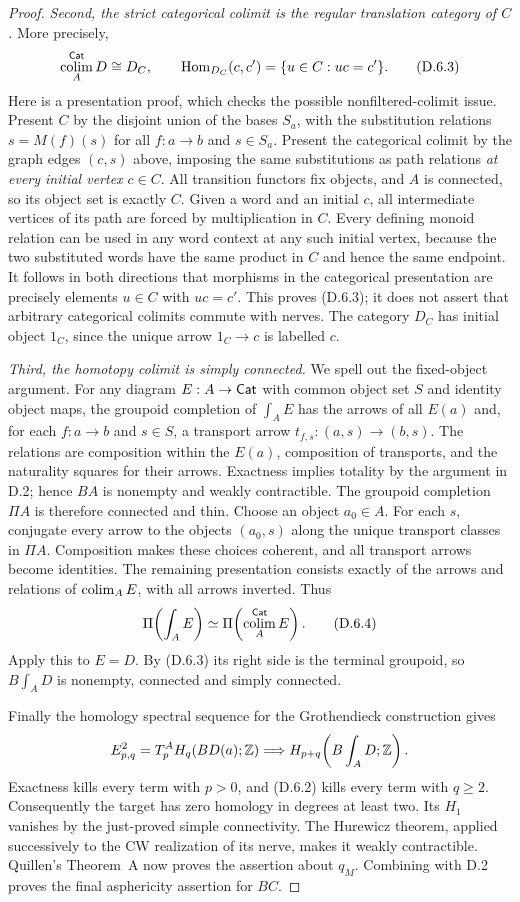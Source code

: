 \begin{proof}
\emph{Second, the strict categorical colimit is the regular
translation category of $C$.} More precisely,
\[
 \operatorname*{colim}_A^{\mathsf{Cat}}D\cong D_C,
 \qquad
 \operatorname{Hom}_{D_C}(c,c')=\{u\in C:uc=c'\}.
 \tag{D.6.3}
\]
Here is a presentation proof, which checks the possible
nonfiltered-colimit issue. Present $C$ by the disjoint union of
the bases $S_a$, with the substitution relations
$s=M(f)(s)$ for all $f:a\to b$ and $s\in S_a$.
Present the categorical colimit by the graph edges $(c,s)$
above, imposing the same substitutions as path relations
\emph{at every initial vertex $c\in C$}. All transition
functors fix objects, and $A$ is connected, so its object set
is exactly $C$. Given a word and an initial $c$, all intermediate
vertices of its path are forced by multiplication in $C$.
Every defining monoid relation can be used in any word context
at any such initial vertex, because the two substituted words
have the same product in $C$ and hence the same endpoint.
It follows in both directions that morphisms in the categorical
presentation are precisely elements $u\in C$ with $uc=c'$.
This proves (D.6.3); it does not assert that arbitrary categorical
colimits commute with nerves. The category $D_C$ has initial
object $1_C$, since the unique arrow $1_C\to c$ is labelled $c$.

\emph{Third, the homotopy colimit is simply connected.}
We spell out the fixed-object argument. For any diagram
$E:A\to\mathsf{Cat}$ with common object set $S$ and identity object
maps, the groupoid completion of $\int_A E$ has the arrows of
all $E(a)$ and, for each $f:a\to b$ and $s\in S$, a transport
arrow $t_{f,s}:(a,s)\to(b,s)$. The relations are composition
within the $E(a)$, composition of transports, and the
naturality squares for their arrows. Exactness implies totality
by the argument in D.2; hence $BA$ is nonempty and weakly
contractible. The groupoid completion $\Pi A$ is therefore
connected and thin. Choose an object $a_0\in A$. For each $s$,
conjugate every arrow to the objects $(a_0,s)$ along the unique
transport classes in $\Pi A$. Composition makes these choices
coherent, and all transport arrows become identities. The
remaining presentation consists exactly of the arrows and
relations of $\operatorname*{colim}_A E$, with all arrows inverted. Thus
\[
 \Pi\!\left(\int_A E\right)
 \simeq\Pi\!\left(\operatorname*{colim}_A^{\mathsf{Cat}}E\right).
 \tag{D.6.4}
\]
Apply this to $E=D$. By (D.6.3) its right side is the terminal
groupoid, so $B\int_A D$ is nonempty, connected and simply
connected.

Finally the homology spectral sequence for the Grothendieck
construction gives
\[
 E^2_{p,q}=T_p^A H_q(BD(a);\mathbb Z)
 \Longrightarrow H_{p+q}\!\left(B\int_A D;\mathbb Z\right).
\]
Exactness kills every term with $p>0$, and (D.6.2) kills every
term with $q\geq2$. Consequently the target has zero homology
in degrees at least two. Its $H_1$ vanishes by the just-proved
simple connectivity. The Hurewicz theorem, applied successively
to the CW realization of its nerve, makes it weakly contractible.
Quillen's Theorem~A now proves the assertion about $q_M$.
Combining with D.2 proves the final asphericity assertion for
$BC$.
\end{proof}

